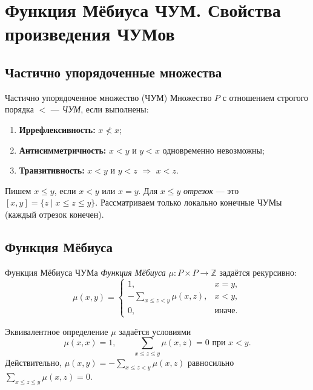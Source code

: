 
\section{Функция Мёбиуса ЧУМ. Свойства произведения ЧУМов}

\subsection{Частично упорядоченные множества}

\begin{Definition}{Частично упорядоченное множество (ЧУМ)}{}
	Множество $P$ с отношением строгого порядка $<$ — \emph{ЧУМ}, если выполнены:
	\begin{enumerate}
		\item \textbf{Иррефлексивность:} $x\not<x$;
		\item \textbf{Антисимметричность:} $x<y$ и $y<x$ одновременно невозможны;
		\item \textbf{Транзитивность:} $x<y$ и $y<z$ $\Rightarrow$ $x<z$.
	\end{enumerate}
	Пишем $x\le y$, если $x<y$ или $x=y$. Для $x\le y$ \emph{отрезок} — это $[x,y]=\{z\mid x\le z\le y\}$. Рассматриваем только локально конечные ЧУМы (каждый отрезок конечен).
\end{Definition}

\subsection{Функция Мёбиуса}

\begin{Definition}{Функция Мёбиуса ЧУМа}{}
	\emph{Функция Мёбиуса} $\mu\colon P\times P\to\mathbb Z$ задаётся рекурсивно:
	\[
	\mu(x,y)=
	\begin{cases}
		1, & x=y,\\[4pt]
		-\displaystyle\sum_{x\le z<y}\mu(x,z), & x<y,\\[6pt]
		0, & \text{иначе.}
	\end{cases}
	\]
\end{Definition}

\begin{Corollary}{Эквивалентное определение}{}
	$\mu$ задаётся условиями
	\[
	\mu(x,x)=1,\qquad \sum_{x\le z\le y}\mu(x,z)=0 \text{ при } x<y.
	\]
	Действительно, $\mu(x,y)=-\sum_{x\le z<y}\mu(x,z)$ равносильно $\sum_{x\le z\le y}\mu(x,z)=0$.
\end{Corollary}

